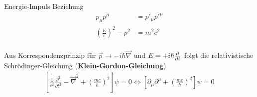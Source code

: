 




{\Huge
Energie-Impuls Beziehung
\\
\begin{align*}
p_\mu p^\mu &= p'_\mu p'^\mu \\
\left(\frac{E}{c}\right)^2 - p^2 &= m^2c^2
\end{align*}
\\
Aus Korrespondenzprinzip für \(\vec p\to-i\hbar\vec\nabla\) und \(E=+i\hbar\pdiff_t\) folgt die relativistische Schrödinger-Gleichung (\textbf{Klein-Gordon-Gleichung})
\\
\begin{align*}
\left[\frac{1}{c^2} \frac{\partial^2}{\partial t^2} - \vec\nabla^2 + \left(\frac{mc}{\hbar}\right)^2 \right]\psi = 0 \Leftrightarrow  
 \left[\partial_\mu\partial^\mu + \left(\frac{mc}{\hbar}\right)^2\right]\psi=0
\end{align*}
\\


}%

